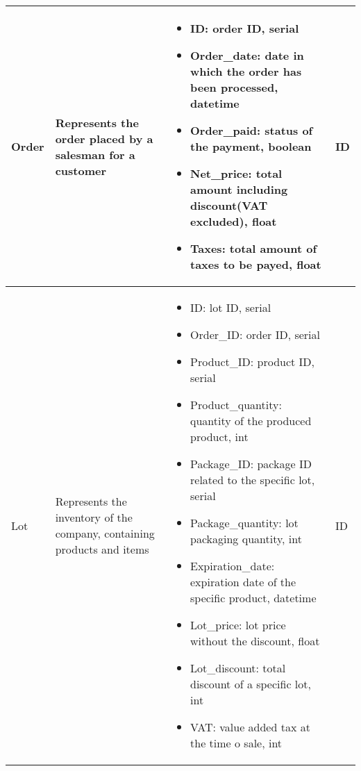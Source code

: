 \begin{longtable}{|p{}|p{} |p{}|p{} |}
    Order & Represents the order placed by a salesman for a customer &
    \begin{itemize}
        \vspace{-1em}
        \item ID:   order ID, serial
        \item Order\_date:   date in which the order has been processed, datetime
        \item Order\_paid:   status of the payment, boolean
        \item Net\_price:   total amount including discount(VAT excluded), float    %
        \item Taxes:   total amount of taxes to be payed, float                     %
    \end{itemize}
    &  ID \\\hline

    Lot & Represents the inventory of the company, containing products and items &
    \begin{itemize}
        \vspace{-1em}
        \item ID:   lot ID, serial
        \item Order\_ID:   order ID, serial     %
        \item Product\_ID:   product ID, serial
        \item Product\_quantity:   quantity of the produced product, int
        \item Package\_ID:   package ID related to the specific lot, serial
        \item Package\_quantity:   lot packaging quantity, int
        \item Expiration\_date:   expiration date of the specific product, datetime
        \item Lot\_price:   lot price without the discount, float
        \item Lot\_discount:   total discount of a specific lot, int
        \item VAT:   value added tax at the time o sale, int
    \end{itemize}
    &  ID \\\hline


\end{longtable}

